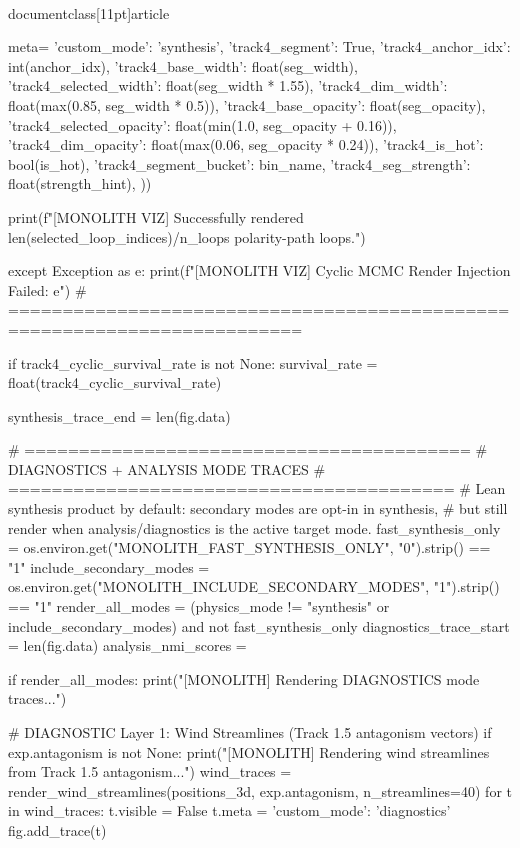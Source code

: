 \\documentclass[11pt]{article}
\begin{document}
\begin{CodeBlock}
{{{{{{                                meta={
                                    'custom_mode': 'synthesis',
                                    'track4_segment': True,
                                    'track4_anchor_idx': int(anchor_idx),
                                    'track4_base_width': float(seg_width),
                                    'track4_selected_width': float(seg_width * 1.55),
                                    'track4_dim_width': float(max(0.85, seg_width * 0.5)),
                                    'track4_base_opacity': float(seg_opacity),
                                    'track4_selected_opacity': float(min(1.0, seg_opacity + 0.16)),
                                    'track4_dim_opacity': float(max(0.06, seg_opacity * 0.24)),
                                    'track4_is_hot': bool(is_hot),
                                    'track4_segment_bucket': bin_name,
                                    'track4_seg_strength': float(strength_hint),
                                }
                            ))
                    
                print(f"[MONOLITH VIZ] Successfully rendered {len(selected_loop_indices)}/{n_loops} polarity-path loops.")
            
    except Exception as e:
        print(f"[MONOLITH VIZ] Cyclic MCMC Render Injection Failed: {e}")
    # =========================================================================

    if track4_cyclic_survival_rate is not None:
        survival_rate = float(track4_cyclic_survival_rate)

    synthesis_trace_end = len(fig.data)

    # =========================================
    # DIAGNOSTICS + ANALYSIS MODE TRACES
    # =========================================
    # Lean synthesis product by default: secondary modes are opt-in in synthesis,
    # but still render when analysis/diagnostics is the active target mode.
    fast_synthesis_only = os.environ.get("MONOLITH_FAST_SYNTHESIS_ONLY", "0").strip() == "1"
    include_secondary_modes = os.environ.get("MONOLITH_INCLUDE_SECONDARY_MODES", "1").strip() == "1"
    render_all_modes = (physics_mode != "synthesis" or include_secondary_modes) and not fast_synthesis_only
    diagnostics_trace_start = len(fig.data)
    analysis_nmi_scores = {}

    if render_all_modes:
        print("[MONOLITH] Rendering DIAGNOSTICS mode traces...")

        # DIAGNOSTIC Layer 1: Wind Streamlines (Track 1.5 antagonism vectors)
        if exp.antagonism is not None:
            print("[MONOLITH] Rendering wind streamlines from Track 1.5 antagonism...")
            wind_traces = render_wind_streamlines(positions_3d, exp.antagonism, n_streamlines=40)
            for t in wind_traces:
                t.visible = False
                t.meta = {'custom_mode': 'diagnostics'}
                fig.add_trace(t)

}}}}}}
\end{CodeBlock}
\end{document}

